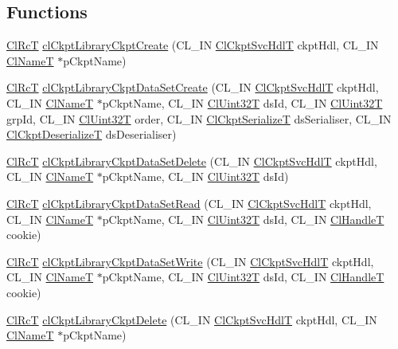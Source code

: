 \subsection*{Functions}
\begin{CompactItemize}
\item 
\hyperlink{group__group2_ga18}{Cl\-Rc\-T} \hyperlink{group__group10_ga4}{cl\-Ckpt\-Library\-Ckpt\-Create} (CL\_\-IN \hyperlink{cl_ckpt_api_8h_a12}{Cl\-Ckpt\-Svc\-Hdl\-T} ckpt\-Hdl, CL\_\-IN \hyperlink{struct_cl_name_t}{Cl\-Name\-T} $\ast$p\-Ckpt\-Name)
\item 
\hyperlink{group__group2_ga18}{Cl\-Rc\-T} \hyperlink{group__group10_ga6}{cl\-Ckpt\-Library\-Ckpt\-Data\-Set\-Create} (CL\_\-IN \hyperlink{cl_ckpt_api_8h_a12}{Cl\-Ckpt\-Svc\-Hdl\-T} ckpt\-Hdl, CL\_\-IN \hyperlink{struct_cl_name_t}{Cl\-Name\-T} $\ast$p\-Ckpt\-Name, CL\_\-IN \hyperlink{group__group2_ga1}{Cl\-Uint32T} ds\-Id, CL\_\-IN \hyperlink{group__group2_ga1}{Cl\-Uint32T} grp\-Id, CL\_\-IN \hyperlink{group__group2_ga1}{Cl\-Uint32T} order, CL\_\-IN \hyperlink{group__group10_ga0}{Cl\-Ckpt\-Serialize\-T} ds\-Serialiser, CL\_\-IN \hyperlink{group__group10_ga1}{Cl\-Ckpt\-Deserialize\-T} ds\-Deserialiser)
\item 
\hyperlink{group__group2_ga18}{Cl\-Rc\-T} \hyperlink{group__group10_ga7}{cl\-Ckpt\-Library\-Ckpt\-Data\-Set\-Delete} (CL\_\-IN \hyperlink{cl_ckpt_api_8h_a12}{Cl\-Ckpt\-Svc\-Hdl\-T} ckpt\-Hdl, CL\_\-IN \hyperlink{struct_cl_name_t}{Cl\-Name\-T} $\ast$p\-Ckpt\-Name, CL\_\-IN \hyperlink{group__group2_ga1}{Cl\-Uint32T} ds\-Id)
\item 
\hyperlink{group__group2_ga18}{Cl\-Rc\-T} \hyperlink{group__group10_ga9}{cl\-Ckpt\-Library\-Ckpt\-Data\-Set\-Read} (CL\_\-IN \hyperlink{cl_ckpt_api_8h_a12}{Cl\-Ckpt\-Svc\-Hdl\-T} ckpt\-Hdl, CL\_\-IN \hyperlink{struct_cl_name_t}{Cl\-Name\-T} $\ast$p\-Ckpt\-Name, CL\_\-IN \hyperlink{group__group2_ga1}{Cl\-Uint32T} ds\-Id, CL\_\-IN \hyperlink{group__group2_ga10}{Cl\-Handle\-T} cookie)
\item 
\hyperlink{group__group2_ga18}{Cl\-Rc\-T} \hyperlink{group__group10_ga8}{cl\-Ckpt\-Library\-Ckpt\-Data\-Set\-Write} (CL\_\-IN \hyperlink{cl_ckpt_api_8h_a12}{Cl\-Ckpt\-Svc\-Hdl\-T} ckpt\-Hdl, CL\_\-IN \hyperlink{struct_cl_name_t}{Cl\-Name\-T} $\ast$p\-Ckpt\-Name, CL\_\-IN \hyperlink{group__group2_ga1}{Cl\-Uint32T} ds\-Id, CL\_\-IN \hyperlink{group__group2_ga10}{Cl\-Handle\-T} cookie)
\item 
\hyperlink{group__group2_ga18}{Cl\-Rc\-T} \hyperlink{group__group10_ga5}{cl\-Ckpt\-Library\-Ckpt\-Delete} (CL\_\-IN \hyperlink{cl_ckpt_api_8h_a12}{Cl\-Ckpt\-Svc\-Hdl\-T} ckpt\-Hdl, CL\_\-IN \hyperlink{struct_cl_name_t}{Cl\-Name\-T} $\ast$p\-Ckpt\-Name)

\end{CompactItemize}
